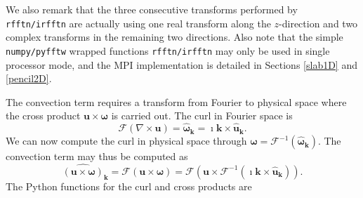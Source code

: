 \documentclass[11pt, oneside]{article}
\newcommand{\inpyth}{\lstinline[style=pythonstyle, basicstyle=\ttfamily]} %[]%
\begin{document}
We also remark that the three consecutive transforms performed by \inpyth{rfftn/irfftn} are actually using one real transform along the $z$-direction and two complex transforms in the remaining two directions. Also note that the simple \texttt{numpy/pyfftw} wrapped functions \inpyth{rfftn/irfftn} may only be used in single processor mode, and the MPI implementation is detailed in Sections
\ref{slab1D} and \ref{pencil2D}.

The convection term requires a transform from Fourier to physical space where the cross product $\bm{u} \times \bm{\omega}$ is carried out. The curl in Fourier space is
\begin{equation}
\mathcal{F}(\nabla \times \bm{u}) = \hat{\bm{\omega}}_{\bm{k}} = \imath \bm{k} \times \hat{\bm{u}}_{\bm{k}}.
\end{equation}
We can now compute the curl in physical space through $\bm{\omega} = \mathcal{F}^{-1}(\hat{\bm{\omega}}_{\bm{k}})$. The convection term may thus be computed as
\begin{equation}
\widehat{( \bm{u} \times \bm{\omega})}_{\bm{k}} = \mathcal{F}(\bm{u} \times \bm{\omega}) = \mathcal{F} (\bm{u} \times \mathcal{F}^{-1}(\imath \bm{k} \times \hat{\bm{u}}_{\bm{k}})).
\label{eq:curl_convection}
\end{equation}
The Python functions for the curl and cross products are
\end{document}
